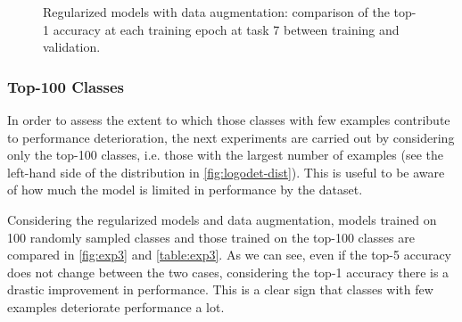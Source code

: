 \begin{figure}[H]
	\centering
    \qquad
	\caption{Regularized models with data augmentation: comparison of the top-1 accuracy at each training epoch at task 7 between training and validation.}%
	\label{fig:exp2-train_val}%
\end{figure}

\newpage
\subsubsection{Top-100 Classes}
In order to assess the extent to which those classes with few examples contribute to performance deterioration, the next experiments are carried out by considering only the top-100 classes, i.e. those with the largest number of examples (see the left-hand side of the distribution in \autoref{fig:logodet-dist}). This is useful to be aware of how much the model is limited in performance by the dataset.

Considering the regularized models and data augmentation, models trained on 100 randomly sampled classes and those trained on the top-100 classes are compared in \autoref{fig:exp3} and \autoref{table:exp3}. As we can see, even if the top-5 accuracy does not change between the two cases, considering the top-1 accuracy there is a drastic improvement in performance. This is a clear sign that classes with few examples deteriorate performance a lot.

